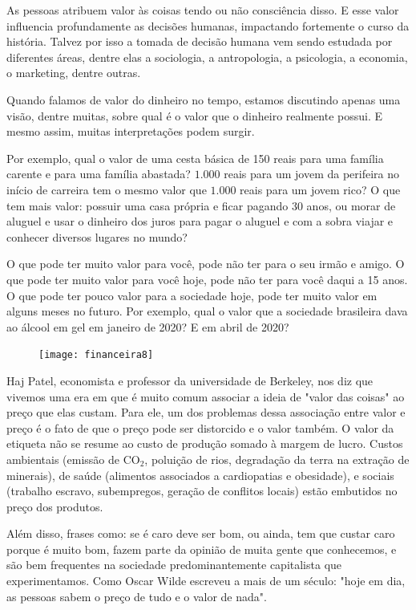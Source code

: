 \begin{reflection}
As pessoas atribuem valor às coisas tendo ou não consciência disso. E esse valor influencia profundamente as decisões humanas, impactando fortemente o curso da história. Talvez por isso a tomada de decisão humana vem sendo estudada por diferentes áreas, dentre elas a sociologia, a antropologia, a psicologia, a economia, o marketing, dentre outras.

Quando falamos de valor do dinheiro no tempo, estamos discutindo apenas uma visão, dentre muitas, sobre qual é o valor que o dinheiro realmente possui. E mesmo assim, muitas interpretações podem surgir.


Por exemplo, qual o valor de uma cesta básica de 150 reais para uma família carente e para uma família abastada? $1.000$ reais para um jovem da perifeira no início de carreira tem o mesmo valor que $1.000$ reais para um jovem rico? O que tem mais valor: possuir uma casa própria e ficar pagando 30 anos, ou morar de aluguel e usar o dinheiro dos juros para pagar o aluguel e com a sobra viajar e conhecer diversos lugares no mundo?

O que pode ter muito valor para você, pode não ter para o seu irmão e amigo. O que pode ter muito valor para você hoje, pode não ter para você daqui a 15 anos. O que pode ter pouco valor para a sociedade hoje, pode ter muito valor em alguns meses no futuro. Por exemplo, qual o valor que a sociedade brasileira dava ao álcool em gel em janeiro de 2020? E em abril de 2020?
\clearpage

\begin{figure}
\vspace{-1.1em}
\texttt{[image: financeira8]}
\end{figure}
Haj Patel, economista e professor da universidade de Berkeley, nos diz que vivemos uma era em que é muito comum associar a ideia de "valor das coisas"{} ao preço que elas custam. Para ele, um dos problemas dessa associação entre valor e preço é o fato de que o preço pode ser distorcido e o valor também. O valor da etiqueta não se resume ao custo de produção somado à margem de lucro. Custos ambientais (emissão de CO$_{\text{2}}$, poluição de rios, degradação da terra na extração de minerais), de saúde (alimentos associados a cardiopatias e obesidade), e sociais (trabalho escravo, subempregos, geração de conflitos locais) estão embutidos no preço dos produtos.

Além disso, frases como: se é caro deve ser bom, ou ainda, tem que custar caro porque é muito bom, fazem parte da opinião de muita gente que conhecemos, e são bem frequentes na sociedade predominantemente capitalista que experimentamos. Como Oscar Wilde escreveu a mais de um século: "hoje em dia, as pessoas sabem o preço de tudo e o valor de nada".


\end{reflection}
